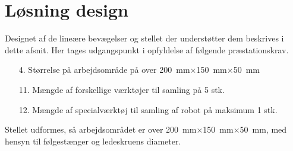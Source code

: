 
\section{Løsning design} \label{Dimensionering af stellet}

Designet af de lineære bevægelser og stellet der understøtter dem beskrives i dette afsnit. Her tages udgangspunkt i opfyldelse af følgende præstationskrav. 

\begin{itemize}
    \item[4.] Størrelse på arbejdsområde på over \SI{200}{mm}$\times$\SI{150}{mm}$\times$\SI{50}{mm} 
    \item[11.] Mængde af forskellige værktøjer til samling på 5 stk.
    \item[12.] Mængde af specialværktøj til samling af robot på maksimum 1 stk.
\end{itemize}

Stellet udformes, så arbejdsområdet er over \SI{200}{mm}$\times$\SI{150}{mm}$\times$\SI{50}{mm}, med hensyn til følgestænger og ledeskruens diameter. 








